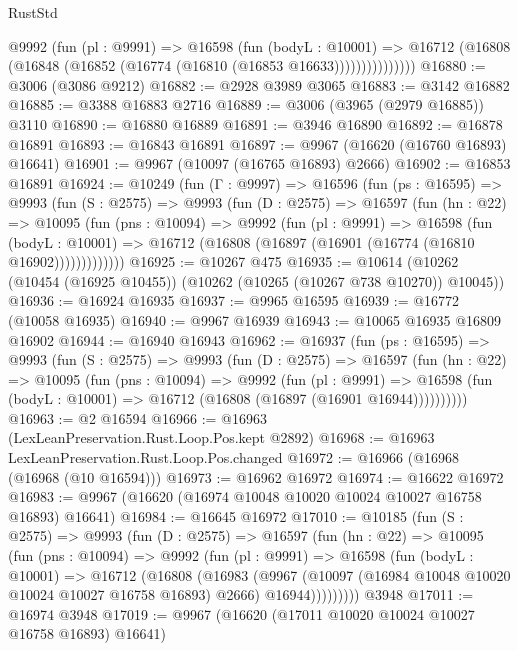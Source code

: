 \begin{lexlean}{RustStd}
\begin{coremodule}
                @9992
                  (fun (pl : @9991) =>
                  @16598
                    (fun (bodyL : @10001) =>
                    @16712 (@16808 (@16848 (@16852 (@16774 (@16810 (@16853 @16633)))))))))))))))
@16880 := @3006 (@3086 @9212)
@16882 := @2928 @3989 @3065
@16883 := @3142 @16882
@16885 := @3388 @16883 @2716
@16889 := @3006 (@3965 (@2979 @16885)) @3110
@16890 := @16880 @16889
@16891 := @3946 @16890
@16892 := @16878 @16891
@16893 := @16843 @16891
@16897 := @9967 (@16620 (@16760 @16893) @16641)
@16901 := @9967 (@10097 (@16765 @16893) @2666)
@16902 := @16853 @16891
@16924 := @10249
    (fun (Γ : @9997) =>
    @16596
      (fun (ps : @16595) =>
      @9993
        (fun (S : @2575) =>
        @9993
          (fun (D : @2575) =>
          @16597
            (fun (hn : @22) =>
            @10095
              (fun (pns : @10094) =>
              @9992
                (fun (pl : @9991) =>
                @16598
                  (fun (bodyL : @10001) =>
                  @16712 (@16808 (@16897 (@16901 (@16774 (@16810 @16902)))))))))))))
@16925 := @10267 @475
@16935 := @10614 (@10262 (@10454 (@16925 @10455)) (@10262 (@10265 (@10267 @738 @10270)) @10045))
@16936 := @16924 @16935
@16937 := @9965 @16595
@16939 := @16772 (@10058 @16935)
@16940 := @9967 @16939
@16943 := @10065 @16935 @16809 @16902
@16944 := @16940 @16943
@16962 := @16937
    (fun (ps : @16595) =>
    @9993
      (fun (S : @2575) =>
      @9993
        (fun (D : @2575) =>
        @16597
          (fun (hn : @22) =>
          @10095
            (fun (pns : @10094) =>
            @9992
              (fun (pl : @9991) =>
              @16598 (fun (bodyL : @10001) => @16712 (@16808 (@16897 (@16901 @16944))))))))))
@16963 := @2 @16594
@16966 := @16963 (LexLeanPreservation.Rust.Loop.Pos.kept @2892)
@16968 := @16963 LexLeanPreservation.Rust.Loop.Pos.changed
@16972 := @16966 (@16968 (@16968 (@10 @16594)))
@16973 := @16962 @16972
@16974 := @16622 @16972
@16983 := @9967 (@16620 (@16974 @10048 @10020 @10024 @10027 @16758 @16893) @16641)
@16984 := @16645 @16972
@17010 := @10185
    (fun (S : @2575) =>
    @9993
      (fun (D : @2575) =>
      @16597
        (fun (hn : @22) =>
        @10095
          (fun (pns : @10094) =>
          @9992
            (fun (pl : @9991) =>
            @16598
              (fun (bodyL : @10001) =>
              @16712
                (@16808
                  (@16983
                    (@9967
                      (@10097 (@16984 @10048 @10020 @10024 @10027 @16758 @16893) @2666)
                      @16944)))))))))
    @3948
@17011 := @16974 @3948
@17019 := @9967 (@16620 (@17011 @10020 @10024 @10027 @16758 @16893) @16641)

\end{coremodule}
\end{lexlean}
